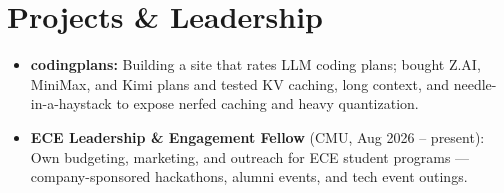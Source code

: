 \documentclass[11pt, letterpaper]{article}
\begin{document}
\section{Projects \& Leadership}
\begin{itemize}
  \item \textbf{codingplans:} Building a site that rates LLM coding plans; bought Z.AI, MiniMax, and Kimi plans and tested KV caching, long context, and needle-in-a-haystack to expose nerfed caching and heavy quantization.
  \item \textbf{ECE Leadership \& Engagement Fellow} (CMU, Aug 2026 -- present): Own budgeting, marketing, and outreach for ECE student programs --- company-sponsored hackathons, alumni events, and tech event outings.
\end{itemize}
\end{document}
